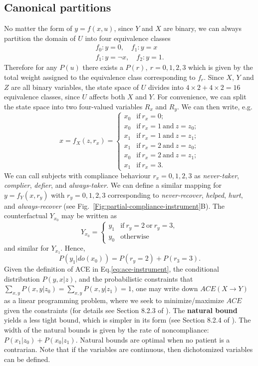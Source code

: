 \documentclass[11pt]{article}
\numberwithin{equation}{section}
\begin{document}
\subsection{Canonical partitions}
No matter the form of $y=f(x,u)$, since $Y$ and $X$ are binary, we can always partition the domain of $U$ into four equivalence classes
\begin{align}
f_0: y=0,\quad f_1: y=x \\
f_1: y = \neg x, \quad f_2: y=1. \nonumber
\end{align}
Therefore for any $P(u)$ there exists a $P(r),\ r=0, 1, 2, 3$ which is given by the total weight assigned to the equivalence class corresponding to $f_r$. Since $X$, $Y$ and $Z$ are all binary variables, the state space of $U$ divides into $4\times 2 + 4\times 2 = 16$ equivalence classes, since $U$ affects both $X$ and $Y$. For convenience, we can split the state space into two four-valued variables $R_x$ and $R_y$. We can then write, e.g.
\begin{equation}
x=f_X(z,r_x)=\begin{cases}
x_0& \text{if}\ r_x=0;\\
x_0& \text{if}\ r_x=1\ \text{and}\ z=z_0;\\
x_1& \text{if}\ r_x=1\ \text{and}\ z=z_1;\\
x_1& \text{if}\ r_x=2\ \text{and}\ z=z_0;\\
x_0& \text{if}\ r_x=2\ \text{and}\ z=z_1;\\
x_1& \text{if}\ r_x=3.
\end{cases}
\end{equation}
We can call subjects with compliance behaviour $r_x=0, 1, 2, 3$ as \textit{never-taker}, \textit{complier}, \textit{defier}, and \textit{always-taker}. We can define a similar mapping for $y=f_Y(x,r_y)$ with $r_y=0, 1, 2, 3$ corresponding to \textit{never-recover}, \textit{helped}, \textit{hurt}, and \textit{always-recover} (see Fig.~\ref{Fig:partial-compliance-instrument}B). The counterfactual $Y_{x_0}$ may be written as
\begin{equation}
Y_{x_0} = \begin{cases}
y_1& \text{if}\ r_y=2\ \text{or}\ r_y=3, \\
y_0& \text{otherwise}
\end{cases}
\end{equation}
and similar for $Y_{x_1}$. Hence,
\begin{equation}
P(y_1|do(x_0))=P(r_y=2) + P(r_3=3).
\end{equation}
Given the definition of ACE in Eq.\eqref{eq:ace-instrument}, the conditional distribution $P(y,x|z)$, and the probabilistic constraints that $\sum_{x,y}P(x,y|z_0)=\sum_{x,y}P(x,y|z_1)=1$, one may write down $ACE(X\rightarrow Y)$ as a linear programming problem, where we seek to minimize/maximize $ACE$ given the constraints (for details see Section 8.2.3 of \cite{pearl09}). The \textbf{natural bound} yields a less tight bound, which is simpler in its form (see Section 8.2.4 of \cite{pearl09}). The width of the natural bounds is given by the rate of noncompliance: $P(x_1|z_0) + P(x_0|z_1)$. Natural bounds are optimal when no patient is a contrarian. Note that if the variables are continuous, then dichotomized variables can be defined.
\end{document}
